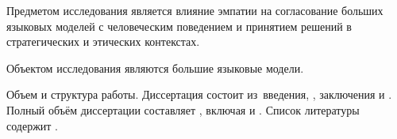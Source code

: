 
Предметом исследования является влияние эмпатии на согласование больших языковых моделей с человеческим поведением и принятием решений в стратегических и этических контекстах.

Объектом исследования являются большие языковые модели.

Объем и структура работы. Диссертация состоит из~введения,
,
заключения и
.
%
Полный объём диссертации составляет
, включая
 и
.
Список литературы содержит
.
